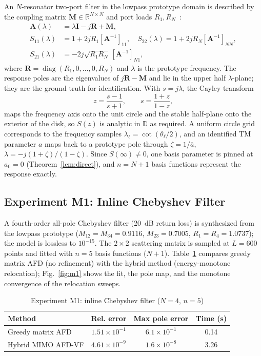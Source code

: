 \documentclass[journal]{IEEEtran}%
\newcommand{\conj}[1]{\overline{#1}}
\begin{document}
An $N$-resonator two-port filter in the lowpass prototype domain is described by the coupling matrix $\mathbf{M} \in \mathbb{R}^{N\times N}$ and port loads $R_1, R_N$~\cite{cameron2003advanced}:
\begin{align}
  \mathbf{A}(\lambda) &= \lambda \mathbf{I} - j\mathbf{R} + \mathbf{M}, \label{eq:cm_model}\\
  S_{11}(\lambda) &= 1 + 2jR_1 [\mathbf{A}^{-1}]_{11}, \quad S_{22}(\lambda) = 1 + 2jR_N [\mathbf{A}^{-1}]_{NN}, \nonumber\\
  S_{21}(\lambda) &= -2j\sqrt{R_1 R_N}\, [\mathbf{A}^{-1}]_{N1}, \nonumber
\end{align}
where $\mathbf{R} = \operatorname{diag}(R_1, 0, \dots, 0, R_N)$ and $\lambda$ is the prototype frequency. The response poles are the eigenvalues of $j\mathbf{R} - \mathbf{M}$ and lie in the upper half $\lambda$-plane; they are the ground truth for identification. With $s = j\lambda$, the Cayley transform
\begin{equation}\label{eq:cayley}
  z = \frac{s - 1}{s + 1}, \qquad s = \frac{1+z}{1-z},
\end{equation}
maps the frequency axis onto the unit circle and the stable half-plane onto the exterior of the disk, so $S(z)$ is analytic in $\mathbb{D}$ as required. A uniform circle grid corresponds to the frequency samples $\lambda_\ell = \cot(\theta_\ell / 2)$, and an identified TM parameter $a$ maps back to a prototype pole through $\zeta = 1/\conj{a}$, $\lambda = -j(1+\zeta)/(1-\zeta)$. Since $S(\infty) \ne 0$, one basis parameter is pinned at $a_0 = 0$ (Theorem~\ref{lem:direct}), and $n = N+1$ basis functions represent the response exactly.

\subsection{Experiment M1: Inline Chebyshev Filter}

A fourth-order all-pole Chebyshev filter (20~dB return loss) is synthesized from the lowpass prototype ($M_{12}=M_{34}=0.9116$, $M_{23}=0.7005$, $R_1=R_4=1.0737$); the model is lossless to $10^{-15}$. The $2\times2$ scattering matrix is sampled at $L = 600$ points and fitted with $n = 5$ basis functions ($N{+}1$). Table~\ref{tab:m1} compares greedy matrix AFD (no refinement) with the hybrid method (energy-monotone relocation); Fig.~\ref{fig:m1} shows the fit, the pole map, and the monotone convergence of the relocation sweeps.

\begin{table}[h]
\centering
\caption{Experiment M1: inline Chebyshev filter ($N=4$, $n=5$)}
\label{tab:m1}
\begin{tabular}{lccc}
\toprule
Method & Rel. error & Max pole error & Time (s) \\
\midrule
Greedy matrix AFD & $1.51 \times 10^{-1}$ & $6.1 \times 10^{-1}$ & 0.14 \\
Hybrid MIMO AFD-VF & $4.61 \times 10^{-9}$ & $1.6 \times 10^{-8}$ & 3.26 \\
\bottomrule
\end{tabular}
\end{table}
\end{document}
